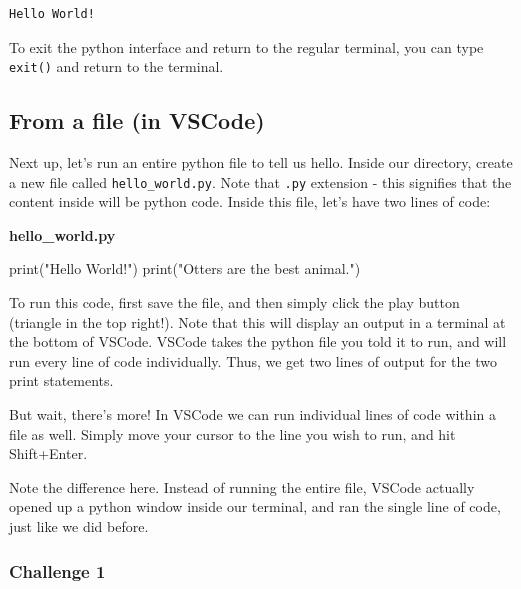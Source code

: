 \documentclass[
  letterpaper,
  DIV=11,
  numbers=noendperiod]{scrreprt}
\newenvironment{Shaded}{\begin{snugshade}}{\end{snugshade}}
\newcommand{\BuiltInTok}[1]{\textcolor[rgb]{0.00,0.23,0.31}{#1}}
\newcommand{\NormalTok}[1]{\textcolor[rgb]{0.00,0.23,0.31}{#1}}
\newcommand{\StringTok}[1]{\textcolor[rgb]{0.13,0.47,0.30}{#1}}
\begin{document}
\begin{verbatim}
Hello World!
\end{verbatim}

To exit the python interface and return to the regular terminal, you can
type \texttt{exit()} and return to the terminal.

\hypertarget{from-a-file-in-vscode}{%
\subsection{From a file (in VSCode)}\label{from-a-file-in-vscode}}

Next up, let's run an entire python file to tell us hello. Inside our
directory, create a new file called \texttt{hello\_world.py}. Note that
\texttt{.py} extension - this signifies that the content inside will be
python code. Inside this file, let's have two lines of code:

\textbf{hello\_world.py}

\begin{Shaded}
\begin{Highlighting}[]
\BuiltInTok{print}\NormalTok{(}\StringTok{"Hello World!"}\NormalTok{)}
\BuiltInTok{print}\NormalTok{(}\StringTok{"Otters are the best animal."}\NormalTok{)}
\end{Highlighting}
\end{Shaded}

To run this code, first save the file, and then simply click the play
button (triangle in the top right!). Note that this will display an
output in a terminal at the bottom of VSCode. VSCode takes the python
file you told it to run, and will run every line of code individually.
Thus, we get two lines of output for the two print statements.

But wait, there's more! In VSCode we can run individual lines of code
within a file as well. Simply move your cursor to the line you wish to
run, and hit Shift+Enter.

Note the difference here. Instead of running the entire file, VSCode
actually opened up a python window inside our terminal, and ran the
single line of code, just like we did before.

\hypertarget{challenge-1}{%
\subsubsection{Challenge 1}\label{challenge-1}}
\end{document}

